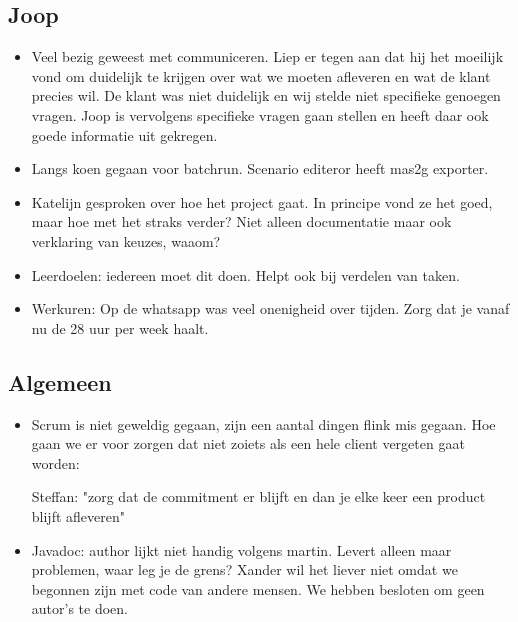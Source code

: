\documentclass{article}
\begin{document}
\subsection*{Joop}
\begin{itemize}
	\item Veel bezig geweest met communiceren. Liep er tegen aan dat hij het moeilijk vond om duidelijk te krijgen over wat we moeten afleveren en wat de klant precies wil. De klant was niet duidelijk en wij stelde niet specifieke genoegen vragen. Joop is vervolgens specifieke vragen gaan stellen en heeft daar ook goede informatie uit gekregen.
	\item Langs koen gegaan voor batchrun. Scenario editeror heeft mas2g exporter.
	\item Katelijn gesproken over hoe het project gaat. In principe vond ze het goed, maar hoe met het straks verder? Niet alleen documentatie maar ook verklaring van keuzes, waaom? 
	\item Leerdoelen: iedereen moet dit doen. Helpt ook bij verdelen van taken. 
	\item Werkuren: Op de whatsapp was veel onenigheid over tijden. Zorg dat je vanaf nu de 28 uur per week haalt. 
\end{itemize}
  
\subsection*{Algemeen}
\begin{itemize}
	\item Scrum is niet geweldig gegaan, zijn een aantal dingen flink mis gegaan. Hoe gaan we er voor zorgen dat niet zoiets als een hele client vergeten gaat worden: \begin{center}
	{Steffan: "zorg dat de commitment er blijft en dan je elke keer een product blijft afleveren" }
	\end{center}
\item Javadoc: author lijkt niet handig volgens martin. Levert alleen maar problemen, waar leg je de grens? Xander wil het liever niet omdat we begonnen zijn met code van andere mensen.  We hebben besloten om geen autor's te doen.
\end{itemize}
\end{document}
